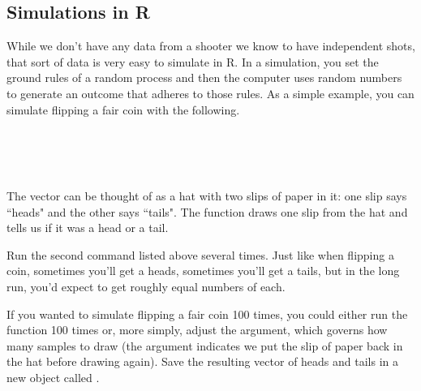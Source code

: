 \documentclass[11pt]{article}
\begin{document}
%

\subsection*{Simulations in R}
While we don't have any data from a shooter we know to have independent shots, that sort of data is very easy to simulate in R.  In a simulation, you set the ground rules of a random process and then the computer uses random numbers to generate an outcome that adheres to those rules.  As a simple example, you can simulate flipping a fair coin with the following.

\ttfamily\noindent
\hlstd{}\hspace*{\fill}\\
\hlstd{}\hlassignement{\usebox{\hlnormalsizeboxlessthan}-}{\ }\hlkeyword{(}\hlkeyword{,}{\ }\hlkeyword{)}\hspace*{\fill}\\
\hlstd{}\hlkeyword{(}\hlkeyword{,}{\ }\hlargument{=}{\ }\hlkeyword{,}{\ }\hlargument{=}{\ }\hlkeyword{)}\hspace*{\fill}\\
\normalfont

The vector \texttt{} can be thought of as a hat with two slips of paper in it: one slip says ``heads" and the other says ``tails". The function \texttt{} draws one slip from the hat and tells us if it was a head or a tail. 

Run the second command listed above several times. Just like when flipping a coin, sometimes you'll get a heads, sometimes you'll get a tails, but in the long run, you'd expect to get roughly equal numbers of each.

If you wanted to simulate flipping a fair coin 100 times, you could either run the function 100 times or, more simply, adjust the \texttt{} argument, which governs how many samples to draw (the \texttt{\hlargument{=}{\ }} argument indicates we put the slip of paper back in the hat before drawing again). Save the resulting vector of heads and tails in a new object called \texttt{}.

\ttfamily\noindent
\hlstd{}\hspace*{\fill}\\
\hlstd{}\hlassignement{\usebox{\hlnormalsizeboxlessthan}-}{\ }\hlkeyword{(}\hlkeyword{,}{\ }\hlargument{=}{\ }\hlkeyword{,}{\ }\hlargument{=}{\ }\hlkeyword{)}\hspace*{\fill}\\
\normalfont
\end{document}
